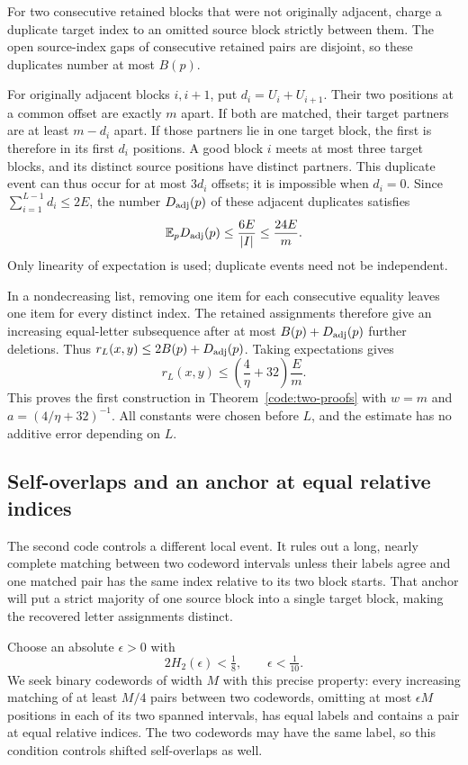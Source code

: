 For two consecutive retained blocks that were not originally adjacent,
charge a duplicate target index to an omitted source block strictly between
them. The open source-index gaps of consecutive retained pairs are disjoint,
so these duplicates number at most $B(p)$.

For originally adjacent blocks $i,i+1$, put $d_i=U_i+U_{i+1}$. Their two
positions at a common offset are exactly $m$ apart. If both are matched,
their target partners are at least $m-d_i$ apart. If those partners lie in
one target block, the first is therefore in its first $d_i$ positions.
A good block $i$ meets at most three target blocks, and its distinct source
positions have distinct partners. This duplicate event can thus occur for
at most $3d_i$ offsets; it is impossible when $d_i=0$. Since
$\sum_{i=1}^{L-1}d_i\leq2E$, the number $D_{\rm adj}(p)$ of these adjacent
duplicates satisfies
\begin{equation}\label{p2:eq:code-offset-duplicates}
 \mathbb E_pD_{\rm adj}(p)\leq\frac{6E}{|I|}\leq\frac{24E}{m}.
\end{equation}
Only linearity of expectation is used; duplicate events need not be
independent.

In a nondecreasing list, removing one item for each consecutive equality
leaves one item for every distinct index. The retained assignments therefore
give an increasing equal-letter subsequence after at most
$B(p)+D_{\rm adj}(p)$ further deletions. Thus
$r_L(x,y)\leq2B(p)+D_{\rm adj}(p)$. Taking expectations gives
\[
 r_L(x,y)\leq\left(\frac4\eta+32\right)\frac Em.
\]
This proves the first construction in Theorem~\ref{code:two-proofs} with
$w=m$ and $a=(4/\eta+32)^{-1}$. All constants were chosen before $L$,
and the estimate has no additive error depending on $L$.

\subsection{Self-overlaps and an anchor at equal relative indices}
\label{p2:sec:code-anchor}
The second code controls a different local event. It rules out a long,
nearly complete matching between two codeword intervals unless their labels
agree and one matched pair has the same index relative to its two block
starts. That anchor will put a strict majority of one source block into a
single target block, making the recovered letter assignments distinct.

Choose an absolute $\epsilon>0$ with
\begin{equation}\label{p2:eq:code-anchor-parameters}
 2H_2(\epsilon)<\tfrac18,\qquad \epsilon<\tfrac1{10}.
\end{equation}
We seek binary codewords of width $M$ with this precise property: every
increasing matching of at least $M/4$ pairs between two codewords, omitting
at most $\epsilon M$ positions in each of its two spanned intervals, has
equal labels and contains a pair at equal relative indices. The two
codewords may have the same label, so this condition controls shifted
self-overlaps as well.

